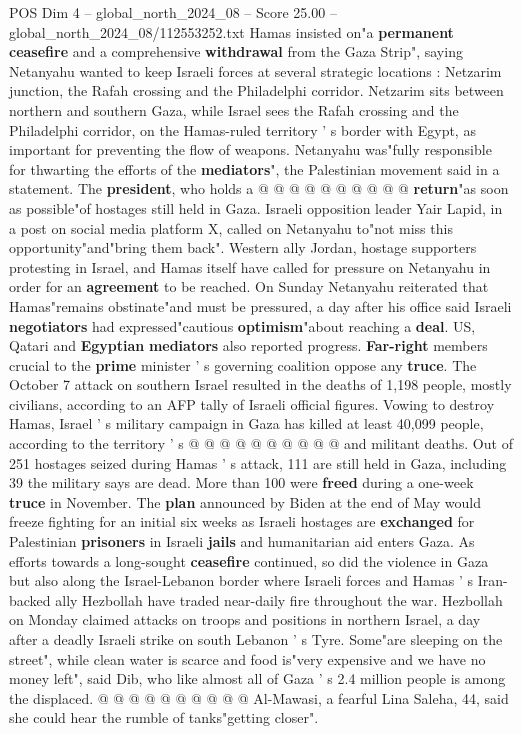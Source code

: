 \begin{textsample}{POS Dim 4 – global\_north\_2024\_08 – Score 25.00 – global\_north\_2024\_08/112553252.txt}
Hamas insisted on"a \textbf{permanent} \textbf{ceasefire} and a comprehensive \textbf{withdrawal} from the Gaza Strip", saying Netanyahu wanted to keep Israeli forces at several strategic locations : Netzarim junction, the Rafah crossing and the Philadelphi corridor.
Netzarim sits between northern and southern Gaza, while Israel sees the Rafah crossing and the Philadelphi corridor, on the Hamas-ruled territory ' s border with Egypt, as important for preventing the flow of weapons.
Netanyahu was"fully responsible for thwarting the efforts of the \textbf{mediators}", the Palestinian movement said in a statement.
The \textbf{president}, who holds a @ @ @ @ @ @ @ @ @ @ \textbf{return}"as soon as possible"of hostages still held in Gaza.
Israeli opposition leader Yair Lapid, in a post on social media platform X, called on Netanyahu to"not miss this opportunity"and"bring them back".
Western ally Jordan, hostage supporters protesting in Israel, and Hamas itself have called for pressure on Netanyahu in order for an \textbf{agreement} to be reached.
On Sunday Netanyahu reiterated that Hamas"remains obstinate"and must be pressured, a day after his office said Israeli \textbf{negotiators} had expressed"cautious \textbf{optimism}"about reaching a \textbf{deal}.
US, Qatari and \textbf{Egyptian} \textbf{mediators} also reported progress. \textbf{Far-right} members crucial to the \textbf{prime} minister ' s governing coalition oppose any \textbf{truce}.
The October 7 attack on southern Israel resulted in the deaths of 1,198 people, mostly civilians, according to an AFP tally of Israeli official figures.
Vowing to destroy Hamas, Israel ' s military campaign in Gaza has killed at least 40,099 people, according to the territory ' s @ @ @ @ @ @ @ @ @ @ and militant deaths.
Out of 251 hostages seized during Hamas ' s attack, 111 are still held in Gaza, including 39 the military says are dead.
More than 100 were \textbf{freed} during a one-week \textbf{truce} in November.
The \textbf{plan} announced by Biden at the end of May would freeze fighting for an initial six weeks as Israeli hostages are \textbf{exchanged} for Palestinian \textbf{prisoners} in Israeli \textbf{jails} and humanitarian aid enters Gaza.
As efforts towards a long-sought \textbf{ceasefire} continued, so did the violence in Gaza but also along the Israel-Lebanon border where Israeli forces and Hamas ' s Iran-backed ally Hezbollah have traded near-daily fire throughout the war.
Hezbollah on Monday claimed attacks on troops and positions in northern Israel, a day after a deadly Israeli strike on south Lebanon ' s Tyre.
Some"are sleeping on the street", while clean water is scarce and food is"very expensive and we have no money left", said Dib, who like almost all of Gaza ' s 2.4 million people is among the displaced. @ @ @ @ @ @ @ @ @ @ Al-Mawasi, a fearful Lina Saleha, 44, said she could hear the rumble of tanks"getting closer".

\end{textsample}
